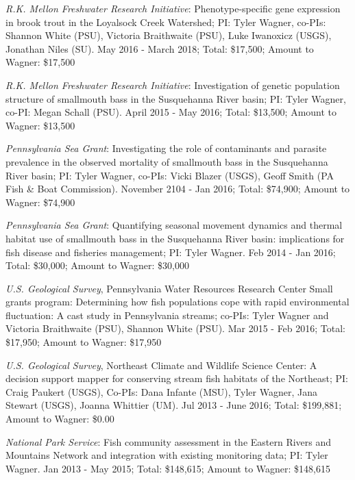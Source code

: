 \documentclass[10pt]{article}
\begin{document}
\begin{flushleft}
\begin{etaremune}
\item {\sl  R.K. Mellon Freshwater Research Initiative}: Phenotype-specific gene expression in brook trout in the Loyalsock Creek Watershed; PI: Tyler Wagner, co-PIs: Shannon White (PSU), Victoria Braithwaite (PSU), Luke Iwanoxicz (USGS), Jonathan Niles (SU). May 2016 - March 2018; Total: \$17,500; Amount to Wagner: \$17,500

\item {\sl  R.K. Mellon Freshwater Research Initiative}: Investigation of genetic population structure of smallmouth bass in the Susquehanna River basin; PI: Tyler Wagner, co-PI: Megan Schall (PSU). April 2015 - May 2016; Total: \$13,500; Amount to Wagner: \$13,500

\item {\sl Pennsylvania Sea Grant}: Investigating the role of contaminants and parasite prevalence in the observed mortality of smallmouth bass in the Susquehanna River basin; PI: Tyler Wagner, co-PIs: Vicki Blazer (USGS), Geoff Smith (PA Fish \& Boat Commission). November 2104 - Jan 2016; Total: \$74,900; Amount to Wagner: \$74,900

\item {\sl Pennsylvania Sea Grant}: Quantifying seasonal movement dynamics and thermal habitat use of smallmouth bass in the Susquehanna River basin: implications for fish disease and fisheries management; PI: Tyler Wagner. Feb 2014 - Jan 2016; Total: \$30,000; Amount to Wagner: \$30,000

\item {\sl U.S. Geological Survey}, Pennsylvania Water Resources Research Center Small grants program: Determining how fish populations cope with rapid environmental fluctuation: A cast study in Pennsylvania streams; co-PIs: Tyler Wagner and Victoria Braithwaite (PSU), Shannon White (PSU). Mar 2015 - Feb 2016; Total: \$17,950; Amount to Wagner: \$17,950

\item {\sl U.S. Geological Survey}, Northeast Climate and Wildlife Science Center: A decision support mapper for conserving stream fish habitats of the Northeast; PI: Craig Paukert (USGS), Co-PIs: Dana Infante (MSU), Tyler Wagner, Jana Stewart (USGS), Joanna Whittier (UM). Jul 2013 - June 2016; Total: \$199,881; Amount to Wagner: \$0.00

\item {\sl National Park Service}: Fish community assessment in the Eastern Rivers and Mountains Network and integration with existing monitoring data; PI: Tyler Wagner. Jan 2013 - May 2015;  Total: \$148,615; Amount to Wagner: \$148,615


\end{etaremune}
\end{flushleft}
\end{document}

